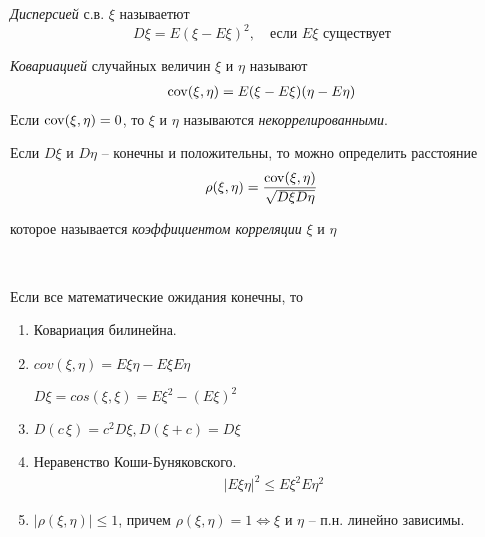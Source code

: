 
\begin{definition}
  \emph{Дисперсией} с.в. $\xi$ называетют
  \begin{equation*}
    D\xi = E(\xi - E\xi)^2, \quad \text{если $E\xi$ существует}
  \end{equation*}
\end{definition}

\begin{definition}
  \emph{Ковариацией} случайных величин $\xi$ и $\eta$ называют
  \begin{align*}
    \operatorname{cov}(\xi, \eta) = E(\xi - E\xi) (\eta - E\eta)
  \end{align*}
  Если $\operatorname{cov}(\xi, \eta) = 0$, то $\xi$ и $\eta$ называются \emph{некоррелированными}.
\end{definition}

Если $D\xi$ и $D\eta$ -- конечны и положительны, то можно определить расстояние
\begin{align*}
  \rho(\xi, \eta) = \frac{\operatorname{cov}(\xi, \eta)}{\sqrt{D \xi D \eta}}
\end{align*}

которое называется \emph{коэффициентом корреляции} $\xi$ и $\eta$

\begin{lemma}~

  Если все математические ожидания конечны, то 
  \begin{enumerate}
    \item 
      Ковариация билинейна.

    \item 
      $cov(\xi, \eta) = E \xi \eta - E\xi E\eta$

      $D\xi = cos(\xi, \xi) = E\xi^2 - (E \xi)^2$

    \item 
      $D(c\, \xi) = c^2 D \xi, D(\xi + c) = D \xi$

    \item 
      Неравенство Коши-Буняковского.
      \begin{align*}
        |E\xi \eta|^2 \leq E\xi^2 E\eta^2
      \end{align*}

    \item 
      $|\rho(\xi, \eta)| \leq 1$, 
      причем $\rho(\xi, \eta) = 1 \iff \xi$ и $\eta$ -- п.н. линейно зависимы.
  \end{enumerate}

\end{lemma}

